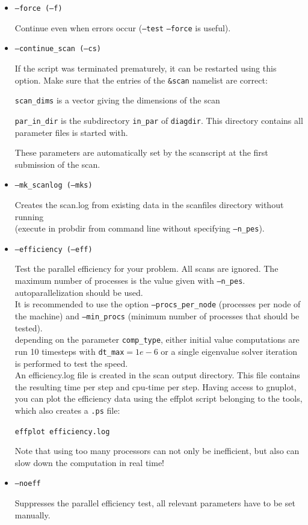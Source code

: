\documentclass[12pt]{article}
\begin{document}
\begin{itemize}
\item \texttt{--force (--f)}

Continue even when errors occur (\texttt{--test} \texttt{--force} is
useful).

\item \texttt{--continue\_scan (--cs)}

If the script was terminated prematurely, it can be restarted using this option.
Make sure that the entries of the \texttt{\&scan} namelist
are correct:

\texttt{scan\_dims} is a vector giving the dimensions of the scan

\texttt{par\_in\_dir} is the subdirectory \texttt{in\_par} of \texttt{diagdir}. This directory contains all
parameter files \gene is started with.

These parameters are automatically set by the scanscript at the first
submission of the scan.

\item \texttt{--mk\_scanlog (--mks)}

Creates the scan.log from existing data in the scanfiles directory without running
\gene\\ (execute in probdir from command line without specifying
\texttt{--n\_pes}).

\item \texttt{--efficiency (--eff)}

Test the parallel efficiency for your problem. All scans are ignored.
The maximum number of processes is the value given with \texttt{--n\_pes}. \gene
autoparallelization should be used.\\
It is recommended to use the option \texttt{--procs\_per\_node}
(processes per node of the machine) and \texttt{--min\_procs} (minimum
number of processes that should be tested).\\
depending on the parameter \texttt{comp\_type}, either initial value
computations are run 10 timesteps with \texttt{dt\_max}$=1e-6$ or
a single eigenvalue solver iteration is performed to test the speed. \\
An efficiency.log file is created in the scan output directory. This
file contains the resulting time per step and cpu-time per step. Having
access to gnuplot, you can
plot the efficiency data using the effplot script belonging to the \gene
tools, which also creates a \texttt{.ps} file:

\texttt{effplot efficiency.log}

Note that using too many processors can not only be inefficient, but also can slow down the
computation in real time!

\item \texttt{--noeff}

Suppresses the parallel efficiency test, all relevant parameters have to
be set manually.
\end{itemize}
\end{document}
